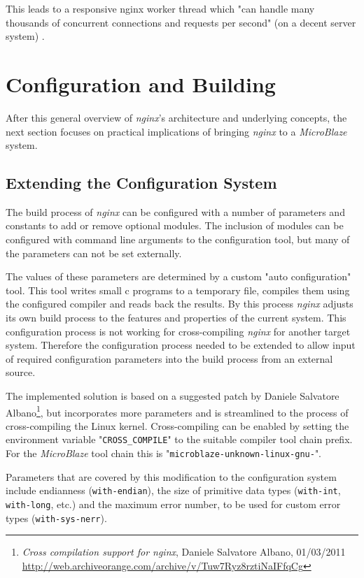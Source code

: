 This leads to a responsive nginx worker thread which "can handle many thousands of concurrent connections and requests per second" (on a decent server system) \cite{aosa}.

\section{Configuration and Building}
\label{sec:nginx-config}

After this general overview of \textit{nginx}'s architecture and underlying concepts, the next section focuses on practical implications of bringing \textit{nginx} to a \textit{MicroBlaze} system.

\subsection{Extending the Configuration System}

The build process of \textit{nginx} can be configured with a number of parameters and constants to add or remove optional modules. The inclusion of modules can be configured with command line arguments to the configuration tool, but many of the parameters can not be set externally.

The values of these parameters are determined by a custom "auto configuration" tool. This tool writes small c programs to a temporary file, compiles them using the configured compiler and reads back the results. By this process \textit{nginx} adjusts its own build process to the features and properties of the current system. This configuration process is not working for cross-compiling \textit{nginx} for another target system. Therefore the configuration process needed to be extended to allow input of required configuration parameters into the build process from an external source.

The implemented solution is based on a suggested patch by Daniele Salvatore Albano\footnote{\textit{Cross compilation support for nginx}, Daniele Salvatore Albano, 01/03/2011 \url{http://web.archiveorange.com/archive/v/Tuw7Ryz8rztiNaIFfqCg}}, but incorporates more parameters and is streamlined to the process of cross-compiling the Linux kernel. Cross-compiling can be enabled by setting the environment variable "\texttt{CROSS\_COMPILE}" to the suitable compiler tool chain prefix. For the \textit{MicroBlaze} tool chain this is "\texttt{microblaze-unknown-linux-gnu-}".

Parameters that are covered by this modification to the configuration system include endianness (\texttt{with-endian}), the size of primitive data types (\texttt{with-int}, \texttt{with-long}, etc.) and the maximum error number, to be used for custom error types (\texttt{with-sys-nerr}).

